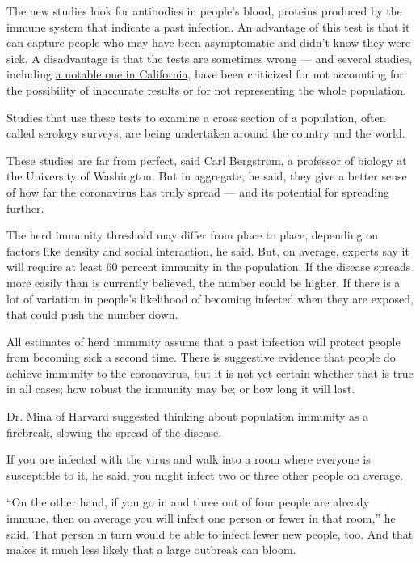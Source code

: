 The new studies look for antibodies in people's blood, proteins produced
by the immune system that indicate a past infection. An advantage of
this test is that it can capture people who may have been asymptomatic
and didn't know they were sick. A disadvantage is that the tests are
sometimes wrong --- and several studies, including
\href{https://www.sfgate.com/news/editorspicks/article/Santa-Clara-antibody-study-revised-Stanford-death-15263047.php}{a
notable one in California}, have been criticized for not accounting for
the possibility of inaccurate results or for not representing the whole
population.

Studies that use these tests to examine a cross section of a population,
often called serology surveys, are being undertaken around the country
and the world.

These studies are far from perfect, said Carl Bergstrom, a professor of
biology at the University of Washington. But in aggregate, he said, they
give a better sense of how far the coronavirus has truly spread --- and
its potential for spreading further.

The herd immunity threshold may differ from place to place, depending on
factors like density and social interaction, he said. But, on average,
experts say it will require at least 60 percent immunity in the
population. If the disease spreads more easily than is currently
believed, the number could be higher. If there is a lot of variation in
people's likelihood of becoming infected when they are exposed, that
could push the number down.

All estimates of herd immunity assume that a past infection will protect
people from becoming sick a second time. There is suggestive evidence
that people do achieve immunity to the coronavirus, but it is not yet
certain whether that is true in all cases; how robust the immunity may
be; or how long it will last.

Dr. Mina of Harvard suggested thinking about population immunity as a
firebreak, slowing the spread of the disease.

If you are infected with the virus and walk into a room where everyone
is susceptible to it, he said, you might infect two or three other
people on average.

``On the other hand, if you go in and three out of four people are
already immune, then on average you will infect one person or fewer in
that room,'' he said. That person in turn would be able to infect fewer
new people, too. And that makes it much less likely that a large
outbreak can bloom.

